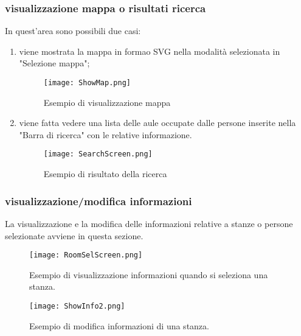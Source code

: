 \subsubsection*{visualizzazione mappa o risultati ricerca}
In quest'area sono possibili due casi:
\begin{enumerate}
\item viene mostrata la mappa in formao SVG nella modalità selezionata in "Selezione mappa";

\begin{figure}[!htb]
\centering%
\texttt{[image: ShowMap.png]}
\caption{Esempio di visualizzazione mappa}\label{Screen:showmap}%
\end{figure}
\FloatBarrier

\item viene fatta vedere una lista delle aule occupate dalle persone inserite nella "Barra di ricerca" con le relative informazione.

\begin{figure}[!htb]
\centering%
\texttt{[image: SearchScreen.png]}%
\caption{Esempio di risultato della ricerca}\label{Screen:search}%
\end{figure}
\FloatBarrier

\end{enumerate}

\subsubsection*{visualizzazione/modifica informazioni}
La visualizzazione e la modifica delle informazioni relative a stanze o persone selezionate avviene in questa sezione.

\begin{figure}[!htb]
\centering%
\texttt{[image: RoomSelScreen.png]}
\caption{Esempio di visualizzazione informazioni quando si seleziona una stanza.}\label{Screen:info1}%
\end{figure}

\begin{figure}[!htb]
\centering%
\texttt{[image: ShowInfo2.png]}%
\caption{Esempio di modifica informazioni di una stanza.}\label{Screen:info2}%
\end{figure}
\FloatBarrier

